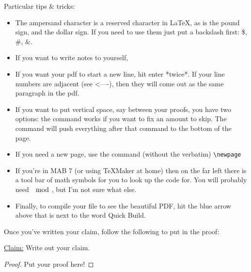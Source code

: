 \documentclass{article}
\begin{document}
Particular tips \& tricks:
\begin{itemize}
\item The ampersand character is a reserved character in LaTeX, as is the pound sign, and the dollar sign.  If you need to use them just put a backslash first: \$, \#, \&.
\item If you want to write notes to yourself, %
\item If you want your pdf to start a new line, hit enter *twice*.  If your line numbers are adjacent (see <----), then they will come out as the same paragraph in the pdf.
\item If you want to put vertical space, say between your proofs, you have two options:
the \vspace{.5in} command works if you want to fix an amount to skip.  The \vfill command will push everything after that command to the bottom of the page.
\item If you need a new page, use the command (without the verbatim) \verb|\newpage|
\item If you're in MAB 7 (or using TeXMaker at home) then on the far left there is a tool bar of math symbols for you to look up the code for.  You will probably need $\mod$, but I'm not sure what else.
\item Finally, to compile your file to see the beautiful PDF, hit the blue arrow above that is next to the word Quick Build.
\end{itemize}

Once you've written your claim, follow the following to put in the proof:

\noindent \underline{Claim:}  Write out your claim.

\begin{proof}
Put your proof here!
\end{proof}
\end{document}
